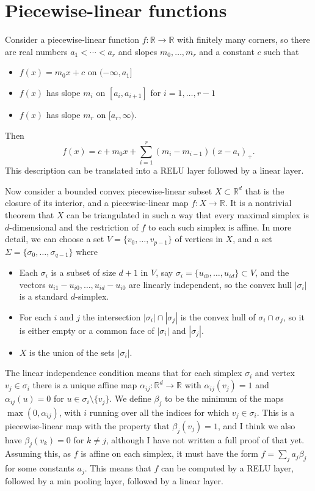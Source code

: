 \documentclass{amsart}
\newcommand{\R}         {{\mathbb{R}}}
\newcommand{\al}        {\alpha}
\newcommand{\bt}        {\beta}
\newcommand{\sg}        {\sigma}
\newcommand{\Sg}        {\Sigma}
\newcommand{\sm}        {\setminus}
\renewcommand{\:}{\colon}
\theoremstyle{definition}
\begin{document}
\section{Piecewise-linear functions}

Consider a piecewise-linear function $f\:\R\to\R$ with finitely many
corners, so there are real numbers $a_1<\dotsb<a_r$ and slopes
$m_0,\dotsc,m_r$ and a constant $c$ such that 
\begin{itemize}
 \item[(a)] $f(x)=m_0x+c$ on $(-\infty,a_1]$
 \item[(b)] $f(x)$ has slope $m_i$ on $[a_i,a_{i+1}]$ for
  $i=1,\dotsc,r-1$
 \item[(c)] $f(x)$ has slope $m_r$ on $[a_r,\infty)$.
\end{itemize}
Then 
\[ f(x) = c + m_0 x + \sum_{i=1}^r (m_i-m_{i-1})(x-a_i)_+. \]
This description can be translated into a RELU layer followed by a
linear layer.

Now consider a bounded convex piecewise-linear subset $X\subset\R^d$
that is the closure of its interior, and a piecewise-linear map 
$f\:X\to\R$.  It is a nontrivial theorem that $X$ can be triangulated
in such a way that every maximal simplex is $d$-dimensional and the
restriction of $f$ to each such simplex is affine.  In more detail, we
can choose a set $V=\{v_0,\dotsc,v_{p-1}\}$ of vertices in $X$, and a
set  $\Sg=\{\sg_0,\dotsc,\sg_{q-1}\}$ where
\begin{itemize}
 \item[(a)] Each $\sg_i$ is a subset of size $d+1$ in $V$, say
  $\sg_i=\{u_{i0},\dotsc,u_{id}\}\subset V$, and the vectors 
  $u_{i1}-u_{i0},\dotsc,u_{id}-u_{i0}$ are linearly independent, so 
  the convex hull $|\sg_i|$ is a standard $d$-simplex.
 \item[(b)] For each $i$ and $j$ the intersection $|\sg_i|\cap|\sg_j|$
  is the convex hull of $\sg_i\cap \sg_j$, so it is either empty or a
  common face of $|\sg_i|$ and $|\sg_j|$.
 \item[(c)] $X$ is the union of the sets $|\sg_i|$.
\end{itemize}
The linear independence condition means that for each simplex $\sg_i$
and vertex $v_j\in\sg_i$ there is a unique affine map
$\al_{ij}\:\R^d\to\R$ with $\al_{ij}(v_j)=1$ and $\al_{ij}(u)=0$ for
$u\in\sg_i\sm\{v_j\}$.  We define $\bt_j$ to be the minimum of the
maps $\max(0,\al_{ij})$, with $i$ running over all the indices for
which $v_j\in\sg_i$.  This is a piecewise-linear map with the property
that $\bt_j(v_j)=1$, and I think we also have $\bt_j(v_k)=0$ for 
$k\neq j$, although I have not written a full proof of that yet.
Assuming this, as $f$ is affine on each simplex, it must have the form
$f=\sum_ja_j\bt_j$ for some constants $a_j$.  This means that $f$ can
be computed by a RELU layer, followed by a min pooling layer, followed
by a linear layer.
\end{document}

